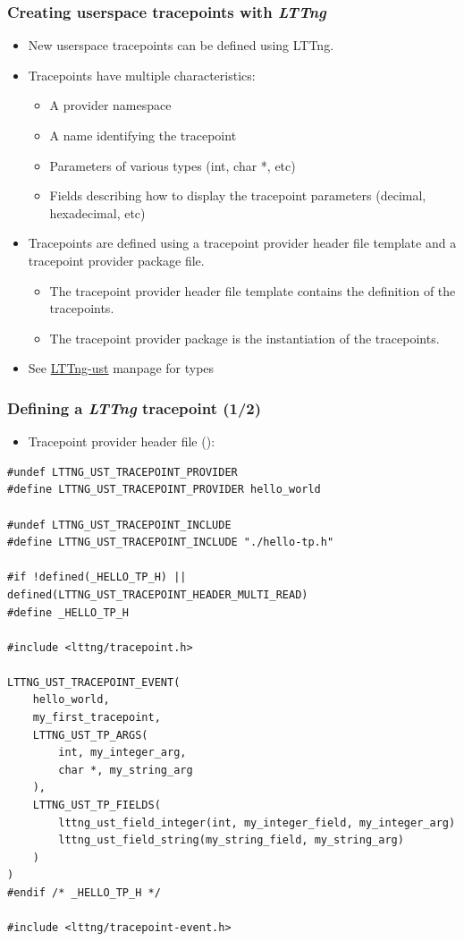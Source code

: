 \begin{frame}
  \frametitle{Creating userspace tracepoints with {\em LTTng}}
  \begin{itemize}
    \item New userspace tracepoints can be defined using LTTng.
    \item Tracepoints have multiple characteristics:
    \begin{itemize}
      \item A provider namespace
      \item A name identifying the tracepoint
      \item Parameters of various types (int, char *, etc)
      \item Fields describing how to display the tracepoint parameters
            (decimal, hexadecimal, etc)
    \end{itemize}
    \item Tracepoints are defined using a tracepoint provider header file
          template and a tracepoint provider package file.
    \begin{itemize}
      \item The tracepoint provider header file template contains the definition
            of the tracepoints.
      \item The tracepoint provider package is the instantiation of the
            tracepoints.
    \end{itemize}
    \item See \href{https://lttng.org/man/3/lttng-ust/v2.13/}{LTTng-ust} manpage
          for types
  \end{itemize}
\end{frame}

\begin{frame}[fragile]
  \frametitle{Defining a {\em LTTng} tracepoint (1/2)}

  \begin{itemize}
    \item Tracepoint provider header file ():
  \end{itemize}
  \begin{block}{}
    \begin{verbatim}
#undef LTTNG_UST_TRACEPOINT_PROVIDER
#define LTTNG_UST_TRACEPOINT_PROVIDER hello_world

#undef LTTNG_UST_TRACEPOINT_INCLUDE
#define LTTNG_UST_TRACEPOINT_INCLUDE "./hello-tp.h"

#if !defined(_HELLO_TP_H) || defined(LTTNG_UST_TRACEPOINT_HEADER_MULTI_READ)
#define _HELLO_TP_H

#include <lttng/tracepoint.h>

LTTNG_UST_TRACEPOINT_EVENT(
    hello_world,
    my_first_tracepoint,
    LTTNG_UST_TP_ARGS(
        int, my_integer_arg,
        char *, my_string_arg
    ),
    LTTNG_UST_TP_FIELDS(
        lttng_ust_field_integer(int, my_integer_field, my_integer_arg)
        lttng_ust_field_string(my_string_field, my_string_arg)
    )
)
#endif /* _HELLO_TP_H */

#include <lttng/tracepoint-event.h>
   \end{verbatim}
  \end{block}
\end{frame}

